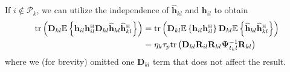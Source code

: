 \documentclass[SIG,biber]{nowfnt}
\newcommand{\vect}[1]{\mathbf{#1}}
\def\tr{\mathrm{tr}}
\def\Htran{\mbox{\tiny $\mathrm{H}$}}
\begin{document}
If $i \not \in \mathcal{P}_k$, we can utilize the independence of $\widehat{\vect{h}}_{kl}$ and $ \vect{h}_{il}$ to
obtain
\begin{align} \nonumber
 \tr\left(\vect{D}_{kl}  \mathbb{E} \left\{ \vect{h}_{il}\vect{h}_{il}^{\Htran} \vect{D}_{kl} \widehat{\vect{h}}_{kl} \widehat{\vect{h}}_{kl}^{\Htran} \right\} \right) &= \tr\left(\vect{D}_{kl}  \mathbb{E} \left\{  \vect{h}_{il}\vect{h}_{il}^{\Htran} \right\}\vect{D}_{kl}\mathbb{E} \left\{  \widehat{\vect{h}}_{kl} \widehat{\vect{h}}_{kl}^{\Htran} \right\} \right)  \\ 
 &= \eta_k \tau_p \tr \left( \vect{D}_{kl} \vect{R}_{il}   \vect{R}_{kl} \vect{\Psi}_{t_k l}^{-1} \vect{R}_{kl} \right)
\end{align}
where we (for brevity) omitted one $\vect{D}_{kl}$ term that does not affect the result.
\end{document}
